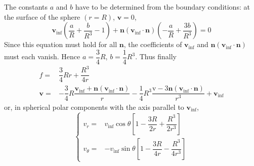\documentclass[conference]{IEEEtran}
\theoremstyle{definition}
\theoremstyle{remark}
\begin{document}
    The constants $a$ and $b$ have to be determined from the boundary conditions: at the surface of the sphere $(r = R)$, $\mathbf{v} = 0$,
    \begin{equation*}
        \mathbf{v}_\mathrm{inf} \left( \dfrac{a}{R} + \dfrac{b}{R^3} - 1 \right) + \mathbf{n} (\mathbf{v}_\mathrm{inf} \cdot \mathbf{n}) \left( -\dfrac{a}{R} + \dfrac{3b}{R^3} \right) = 0
    \end{equation*}
    Since this equation must hold for all $\mathbf{n}$, the coefficients of $\mathbf{v}_\mathrm{inf}$ and $\mathbf{n} (\mathbf{v}_\mathrm{inf} \cdot \mathbf{n})$ must each vanish. Hence $a = \dfrac34R$, $b = \dfrac14R^3$. Thus finally
    \begin{align}
        f =& \dfrac34 Rr + \dfrac{R^3}{4r} \\
        \mathbf{v} =& -\dfrac34 R \dfrac{\mathbf{v}_\mathrm{inf} + \mathbf{n} (\mathbf{v}_\mathrm{inf} \cdot \mathbf{n})}r - \dfrac14 R^3 \dfrac{\mathrm{v} - 3\mathbf{n} (\mathbf{v}_\mathrm{inf} \cdot \mathbf{n})}{r^3} + \mathbf{v}_\mathrm{inf}
    \end{align}
    or, in spherical polar components with the axis parallel to $\mathbf{v}_\mathrm{inf}$,
    \begin{equation*}
        \left\{
            \begin{aligned}
                v_r =& v_\mathrm{inf} \cos \theta \left[ 1 - \dfrac{3R}{2r} + \dfrac{R^3}{2r^3} \right] \\
                v_\theta =& -v_\mathrm{inf} \sin \theta \left[ 1 - \dfrac{3R}{4r} - \dfrac{R^3}{4r^3} \right]
            \end{aligned}
        \right.
    \end{equation*}
    
\end{document}

